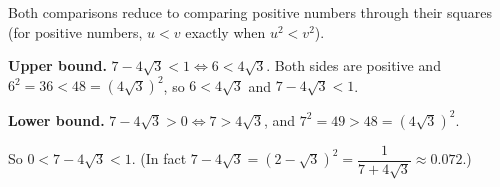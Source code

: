 Both comparisons reduce to comparing positive numbers through their squares (for positive numbers, $u<v$ exactly when $u^2<v^2$).

\textbf{Upper bound.} $7-4\sqrt3<1\iff6<4\sqrt3$. Both sides are positive and $6^2=36<48=(4\sqrt3)^2$, so $6<4\sqrt3$ and $7-4\sqrt3<1$.

\textbf{Lower bound.} $7-4\sqrt3>0\iff7>4\sqrt3$, and $7^2=49>48=(4\sqrt3)^2$.

So $0<7-4\sqrt3<1$. (In fact $7-4\sqrt3=(2-\sqrt3)^2=\dfrac{1}{7+4\sqrt3}\approx0.072$.)
